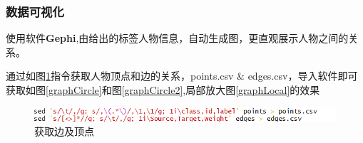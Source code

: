 \documentclass{ctexart}
\begin{document}
	\subsubsection{数据可视化}
	\par 使用软件\textbf{Gephi},由给出的标签人物信息，自动生成图，更直观展示人物之间的关系。
	\par 通过如图\ref{getPointsEdges}指令获取人物顶点和边的关系，points.csv \& edges.csv，导入软件即可获取如图\ref{graphCircle}和图\ref{graphCircle2},局部放大图\ref{graphLocal}的效果
	\begin{figure}[H]
		\centering
		\includegraphics[width=0.8\linewidth]{pic/visible/Visible}
		\caption{获取边及顶点}
		\label{getPointsEdges}
	\end{figure}
	
\end{document}
